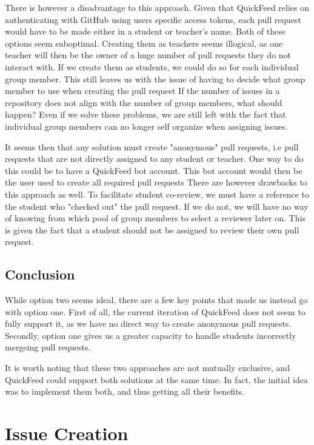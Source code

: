 There is however a disadvantage to this approach.
Given that QuickFeed relies on authenticating with GitHub using users specific access tokens, each pull request would have to be made either in a student or teacher's name.
Both of these options seem suboptimal.
Creating them as teachers seems illogical, as one teacher will then be the owner of a huge number of pull requests they do not interact with.
If we create them as students, we could do so for each individual group member.
This still leaves us with the issue of having to decide what group member to use when creating the pull request
If the number of issues in a repository does not align with the number of group members, what should happen?
Even if we solve these problems, we are still left with the fact that individual group members can no longer self organize when assigning issues.

It seems then that any solution must create "anonymous" pull requests, i.e pull requests that are not directly assigned to any student or teacher.
One way to do this could be to have a QuickFeed bot account.
This bot account would then be the user used to create all required pull requests 
There are however drawbacks to this approach as well.
To facilitate student co-review, we must have a reference to the student who "checked out" the pull request.
If we do not, we will have no way of knowing from which pool of group members to select a reviewer later on.
This is given the fact that a student should not be assigned to review their own pull request.

\subsection{Conclusion}

While option two seems ideal, there are a few key points that made us instead go with option one.
First of all, the current iteration of QuickFeed does not seem to fully support it, as we have no direct way to create anonymous pull requests.
Secondly, option one gives us a greater capacity to handle students incorrectly mergeing pull requests.

It is worth noting that these two approaches are not mutually exclusive, and QuickFeed could support both solutions at the same time.
In fact, the initial idea was to implement them both, and thus getting all their benefits.

\section{Issue Creation}
\label{sec:issue-creation}

